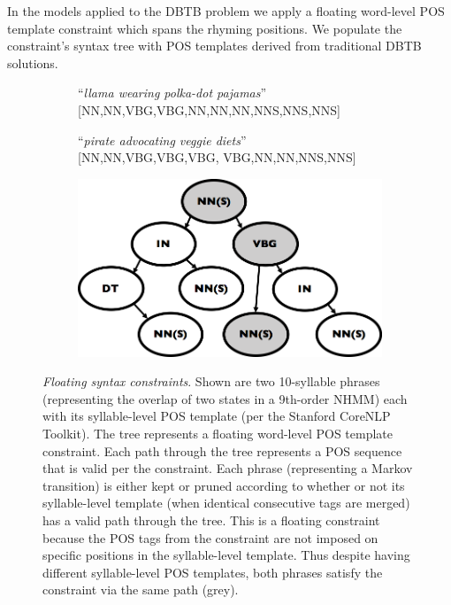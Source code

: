 \documentclass[phd,electronic,oneside,twosidetoc,letterpaper,chaptercenter,parttop,lol,lof,lot]{byumsphd}
\begin{document}
In the models applied to the DBTB problem we apply a floating word-level POS template constraint which spans the rhyming positions. We populate the constraint's syntax tree with POS templates derived from traditional DBTB solutions.

\begin{figure}
    \centering
    \begin{subfigure}[b]{\linewidth}
       	\centering
		``\textit{llama wearing polka-dot pajamas}'' \\
		{[NN,NN,VBG,VBG,NN,NN,NN,NNS,NNS,NNS]} \\
	\end{subfigure}
    \begin{subfigure}[b]{\linewidth}
    	\vspace{.3cm}
        \centering
        ``\textit{pirate advocating veggie diets}'' \\
		{[NN,NN,VBG,VBG,VBG, VBG,NN,NN,NNS,NNS]} \\
    \end{subfigure}
    \begin{subfigure}[b]{.7\linewidth}
        \vspace{.3cm}
        \includegraphics[width=\linewidth]{syntax_tree}
    \end{subfigure}
    \caption{\textit{Floating syntax constraints}. Shown are two 10-syllable phrases (representing the overlap of two states in a 9th-order NHMM) each with its syllable-level POS template (per the Stanford CoreNLP Toolkit). The tree represents a floating word-level POS template constraint. Each path through the tree represents a POS sequence that is valid per the constraint. Each phrase (representing a Markov transition) is either kept or pruned according to whether or not its syllable-level template (when identical consecutive tags are merged) has a valid path through the tree. This is a floating constraint because the POS tags from the constraint are not imposed on specific positions in the syllable-level template. Thus despite having different syllable-level POS templates, both phrases satisfy the constraint via the same path (grey).}
    \label{fig:syntax_tree}
\end{figure}
\end{document}
